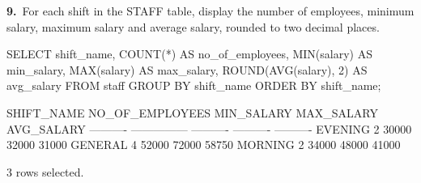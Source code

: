 \noindent\begin{minipage}{\linewidth}
\begingroup{}
{\fontsize{14}{17}\selectfont\textbf{9.}}\ For each shift in the STAFF table, display the number of employees, minimum salary, maximum salary and average salary, rounded to two decimal places.\par
\endgroup\vspace{12pt}


\begin{sqlcode}
SELECT shift_name, COUNT(*) AS no_of_employees,
       MIN(salary) AS min_salary, MAX(salary) AS max_salary,
       ROUND(AVG(salary), 2) AS avg_salary
FROM staff
GROUP BY shift_name
ORDER BY shift_name;
\end{sqlcode}

\vspace{18pt}


\begin{sqlout}[fontsize=\small]
SHIFT_NAME  NO_OF_EMPLOYEES  MIN_SALARY  MAX_SALARY  AVG_SALARY
----------  ---------------  ----------  ----------  ----------
EVENING                   2       30000       32000       31000
GENERAL                   4       52000       72000       58750
MORNING                   2       34000       48000       41000

3 rows selected.
\end{sqlout}
\end{minipage}\par\vspace{24pt}

